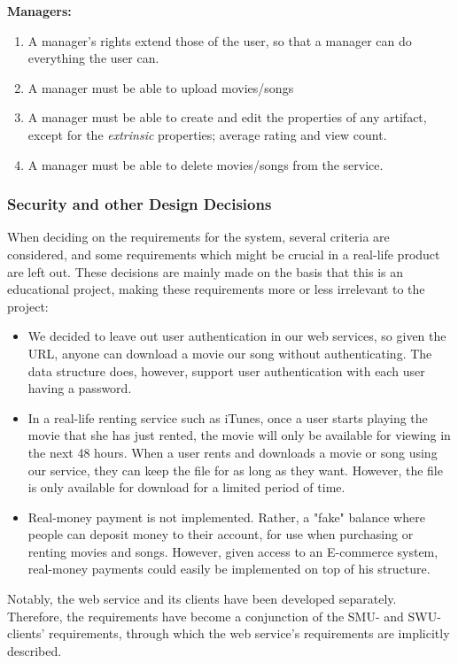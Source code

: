 \textbf{Managers:}
\begin{enumerate}
\setcounter{enumi}{\theenumTemp}
\item A manager's rights extend those of the user, so that a manager can do
	everything the user can.
\item A manager must be able to upload movies/songs
\item A manager must be able to create and edit the properties of any artifact,
	except for the \emph{extrinsic} properties; average rating and view
	count.
\item A manager must be able to delete movies/songs from the service.
\end{enumerate}

\subsubsection{Security and other Design Decisions}

When deciding on the
requirements for the system, several criteria are considered, and some
requirements which might be crucial in a real-life product are left out. These
decisions are mainly made on the basis that this is an educational project,
making these requirements more or less irrelevant to the project:
\begin{itemize}
\item We decided to leave out user authentication in our web services, so given
	the URL, anyone can download a movie our song without authenticating.
	The data structure does, however, support user authentication with each
	user having a password.
\item In a real-life renting service such as iTunes, once a user starts playing
	the movie that she has just rented, the movie will only be available
	for viewing in the next 48 hours. When a user rents and downloads a
	movie or song using our service, they can keep the file for as long as
	they want. However, the file is only available for download for a
	limited period of time.
\item Real-money payment is not implemented. Rather, a "fake" balance where
	people can deposit money to their account, for use when purchasing or
	renting movies and songs. However, given access to an E-commerce
	system, real-money payments could easily be implemented on top of his
	structure.
\end{itemize}

Notably, the web service and its clients have been developed separately.
Therefore, the requirements have become a conjunction of the SMU- and
SWU-clients' requirements, through which the web service's requirements are
implicitly described.

